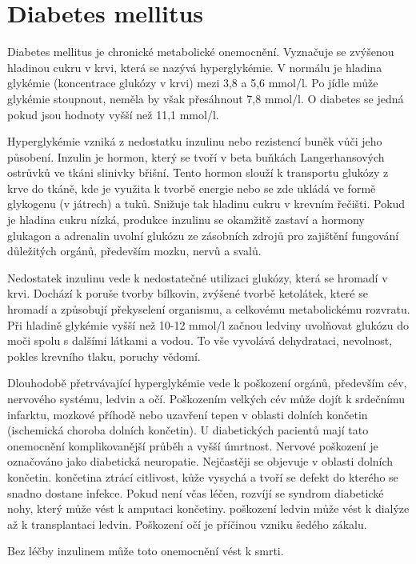 \chapter{Diabetes mellitus}

Diabetes mellitus je chronické metabolické onemocnění. Vyznačuje se zvýšenou hladinou cukru v krvi, která se nazývá hyperglykémie. V normálu je hladina glykémie (koncentrace glukózy v krvi) mezi 3,8 a 5,6 mmol/l. Po jídle může glykémie stoupnout, neměla by však přesáhnout 7,8 mmol/l. O diabetes se jedná pokud jsou hodnoty vyšší než 11,1 mmol/l.

Hyperglykémie vzniká z nedostatku inzulinu nebo rezistencí buněk vůči jeho působení. Inzulin je hormon, který se tvoří v beta buňkách Langerhansových ostrůvků ve tkáni slinivky břišní. Tento hormon slouží k transportu glukózy z krve do tkáně, kde je využita k tvorbě energie nebo se zde ukládá ve formě glykogenu (v játrech) a tuků. Snižuje tak hladinu cukru v krevním řečišti. Pokud je hladina cukru nízká, produkce inzulinu se okamžitě zastaví  a hormony glukagon a adrenalin uvolní glukózu ze zásobních zdrojů pro zajištění fungování důležitých orgánů, především mozku, nervů a svalů.

Nedostatek inzulinu vede k nedostatečné utilizaci glukózy, která se hromadí v krvi. Dochází k poruše tvorby bílkovin, zvýšené tvorbě ketolátek, které se hromadí a způsobují překyselení organismu, a celkovému metabolickému rozvratu. Při hladině glykémie vyšší než 10-12 mmol/l začnou ledviny uvolňovat glukózu do moči spolu s dalšími látkami a vodou. To vše vyvolává dehydrataci, nevolnost, pokles krevního tlaku, poruchy vědomí.

Dlouhodobě přetrvávající hyperglykémie vede k poškození orgánů, především cév, nervového systému, ledvin a očí. Poškozením velkých cév může dojít k srdečnímu infarktu, mozkové příhodě nebo uzavření tepen v oblasti dolních končetin (ischemická choroba dolních končetin). U diabetických pacientů mají tato onemocnění komplikovanější průběh a vyšší úmrtnost. Nervové poškození je označováno jako diabetická neuropatie. Nejčastěji se objevuje v oblasti dolních končetin. končetina ztrácí citlivost, kůže vysychá a tvoří se defekt do kterého se snadno dostane infekce. Pokud není včas léčen, rozvíjí se syndrom diabetické nohy, který může vést k amputaci končetiny. poškození ledvin může vést k dialýze až k transplantaci ledvin. Poškození očí je příčinou vzniku šedého zákalu.

Bez léčby inzulinem může toto onemocnění vést k smrti. \cite{Diabetes.Psottova,Wikiskripta,cukrovka.cz,Diabetes.TaiN}


